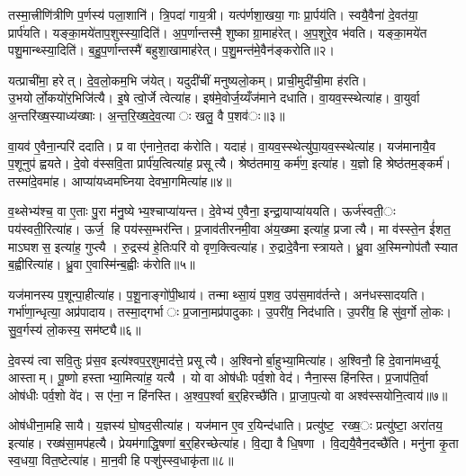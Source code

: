 तस्मा॒त्त्रीणि॑त्रीणि प॒र्णस्य॑ पला॒शानि॑। त्रि॒पदा॑ गाय॒त्री। यत्प॑र्णशा॒खया॒ गाः प्रा॒र्पय॑ति। स्वयै॒वैना॑ दे॒वत॑या॒ प्रार्प॑यति। यङ्का॒मये॑ताप॒शुस्स्या॒दिति॑। अ॒प॒र्णान्तस्मै॒ शुष्काग्रा॒माह॑रेत्। अ॒प॒शुरे॒व भ॑वति। यङ्का॒मये॑त पशु॒मान्थ्स्या॒दिति॑। ब॒हु॒प॒र्णान्तस्मै॑ बहुशा॒खामाह॑रेत्। प॒शु॒मन्त॑मे॒वैन॑ङ्करोति॥२।

यत्प्राची॑मा॒ हरेत्। दे॒व॒लो॒कम॒भि ज॑येत्। यदुदी॑चीं मनुष्यलो॒कम्। प्राची॒मुदी॑ची॒मा ह॑रति। उ॒भयोर्लो॒कयो॑र॒भिजि॑त्यै। इ॒षे त्वो॒र्जे त्वेत्या॑ह। इष॑मे॒वोर्ज॒य्यँज॑माने दधाति। वा॒यव॒स्स्थेत्या॑ह। वा॒युर्वा अ॒न्तरि॑ख्ष॒स्याध्य॑ख्षाः। अ॒न्त॒रि॒ख्ष॒दे॒व॒त्याः खलु॒ वै प॒शव॑ः॥३॥

वा॒यव॑ ए॒वैना॒न्परि॑ ददाति। प्र वा ए॑नाने॒तदा क॑रोति। यदाह॑। वा॒यव॒स्स्थेत्यु॑पा॒यव॒स्स्थेत्या॑ह। यज॑मानायै॒व प॒शूनुप॑ ह्वयते। दे॒वो व॑स्सवि॒ता प्रार्प॑य॒त्वित्या॑ह॒ प्रसूत्यै। श्रेष्ठ॑तमाय॒ कर्म॑ण॒ इत्या॑ह। य॒ज्ञो हि श्रेष्ठ॑तम॒ङ्कर्म॑। तस्मा॑दे॒वमा॑ह। आप्या॑यध्वमघ्निया देवभा॒गमित्या॑ह॥४॥

व॒थ्सेभ्य॑श्च॒ वा ए॒ताः पु॒रा म॑नु॒ष्येभ्य॒श्चाप्या॑यन्त। दे॒वेभ्य॑ ए॒वैना॒ इन्द्रा॒याप्या॑ययति। ऊर्ज॑स्वती॒ः पय॑स्वती॒रित्या॑ह। ऊर्ज॒ हि पय॑स्स॒म्भर॑न्ति। प्र॒जाव॑तीरनमी॒वा अ॑य॒ख्ष्मा इत्या॑ह॒ प्रजात्यै। मा व॑स्स्ते॒न ई॑शत॒ माऽघशस॒ इत्या॑ह॒ गुप्त्यै। रु॒द्रस्य॑ हे॒तिःपरि॑ वो वृण॒क्त्वित्या॑ह। रु॒द्रादे॒वैनास्त्रायते। ध्रु॒वा अ॒स्मिन्गोप॑तौ स्यात ब॒ह्वीरित्या॑ह। ध्रु॒वा ए॒वास्मि॑न्ब॒ह्वीः क॑रोति॥५॥

यज॑मानस्य प॒शून्पा॒हीत्या॑ह। प॒शू॒नाङ्गो॑पी॒थाय॑। तन्माथ्सा॒यं प॒शव॒ उप॑स॒माव॑र्तन्ते। अन॑धस्सादयति। गर्भा॑णा॒न्धृत्या॒ अप्र॑पादाय। तस्मा॒द्गर्भाः प्र॒जाना॒मप्र॑पादुकाः। उ॒परी॑व॒ निद॑धाति। उ॒परी॑व॒ हि सु॑व॒र्गो लो॒कः। सु॒व॒र्गस्य॑ लो॒कस्य॒ सम॑ष्ट्यै॥६॥


दे॒वस्य॑ त्वा सवि॒तुः प्र॑स॒व इत्य॑श्वप॒र्॒शुमाद॑त्ते॒ प्रसूत्यै। अ॒श्विनोर्बा॒हुभ्या॒मित्या॑ह। अ॒श्विनौ॒ हि दे॒वाना॑मध्व॒र्यू आस्ताम्। पू॒ष्णो हस्ताभ्या॒मित्या॑ह॒ यत्यै। यो वा ओष॑धीः पर्व॒शो वेद॑। नैना॒स्स हि॑नस्ति। प्र॒जाप॑ति॒र्वा ओष॑धीः पर्व॒शो वे॑द। स ए॑ना॒ न हि॑नस्ति। अ॒श्व॒प॒र्श्वा ब॒र्॒हिरच्छै॑ति। प्रा॒जा॒प॒त्यो वा अश्व॑स्सयोनि॒त्वाय॑॥७॥

ओष॑धीना॒महिसायै। य॒ज्ञस्य॑ घो॒षद॒सीत्या॑ह। यज॑मान ए॒व र॒यिन्द॑धाति। प्रत्यु॑ष्ट॒ रख्ष॒ः प्रत्यु॑ष्टा॒ अरा॑तय॒ इत्या॑ह। रख्ष॑सा॒मप॑हत्यै। प्रेयम॑गाद्धि॒षणा॑ ब॒र्॒हिरच्छेत्या॑ह। वि॒द्या वै धि॒षणा। वि॒द्ययै॒वैन॒दच्छै॑ति। मनु॑ना कृ॒ता स्व॒धया॒ वित॒ष्टेत्या॑ह। मा॒न॒वी हि पऱ्शु॑स्स्व॒धाकृ॑ता॥८॥

